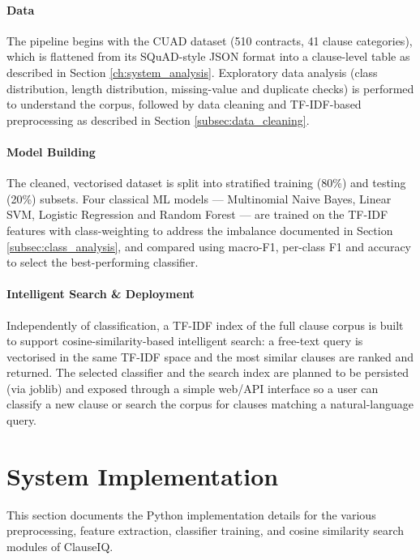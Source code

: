 \documentclass[12pt, a4paper]{report}
\begin{document}
\paragraph{Data}
The pipeline begins with the CUAD dataset (510 contracts, 41 clause categories), which is flattened from its SQuAD-style JSON format into a clause-level table as described in Section \ref{ch:system_analysis}. Exploratory data analysis (class distribution, length distribution, missing-value and duplicate checks) is performed to understand the corpus, followed by data cleaning and TF-IDF-based preprocessing as described in Section \ref{subsec:data_cleaning}.

\paragraph{Model Building}
The cleaned, vectorised dataset is split into stratified training (80\%) and testing (20\%) subsets. Four classical ML models — Multinomial Naive Bayes, Linear SVM, Logistic Regression and Random Forest — are trained on the TF-IDF features with class-weighting to address the imbalance documented in Section \ref{subsec:class_analysis}, and compared using macro-F1, per-class F1 and accuracy to select the best-performing classifier.

\paragraph{Intelligent Search \& Deployment}
Independently of classification, a TF-IDF index of the full clause corpus is built to support cosine-similarity-based intelligent search: a free-text query is vectorised in the same TF-IDF space and the most similar clauses are ranked and returned. The selected classifier and the search index are planned to be persisted (via joblib) and exposed through a simple web/API interface so a user can classify a new clause or search the corpus for clauses matching a natural-language query.

\section{System Implementation}
\label{sec:system_implementation}
This section documents the Python implementation details for the various preprocessing, feature extraction, classifier training, and cosine similarity search modules of ClauseIQ.
\end{document}
